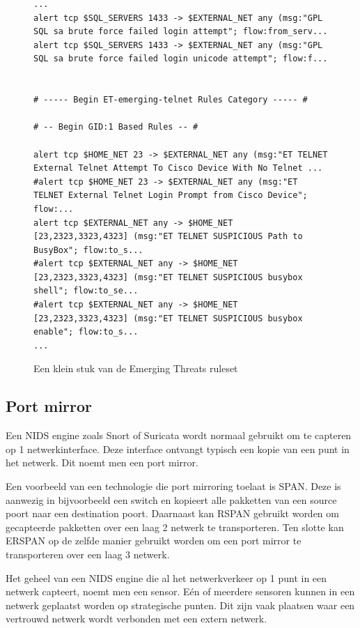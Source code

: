 \documentclass[a4paper,12pt]{report}
\begin{document}
\begin{figure}[H]
  \begin{lstlisting}[basicstyle=\ttfamily\scriptsize]
...
alert tcp $SQL_SERVERS 1433 -> $EXTERNAL_NET any (msg:"GPL SQL sa brute force failed login attempt"; flow:from_serv...
alert tcp $SQL_SERVERS 1433 -> $EXTERNAL_NET any (msg:"GPL SQL sa brute force failed login unicode attempt"; flow:f...


# ----- Begin ET-emerging-telnet Rules Category ----- #

# -- Begin GID:1 Based Rules -- #

alert tcp $HOME_NET 23 -> $EXTERNAL_NET any (msg:"ET TELNET External Telnet Attempt To Cisco Device With No Telnet ...
#alert tcp $HOME_NET 23 -> $EXTERNAL_NET any (msg:"ET TELNET External Telnet Login Prompt from Cisco Device"; flow:...
alert tcp $EXTERNAL_NET any -> $HOME_NET [23,2323,3323,4323] (msg:"ET TELNET SUSPICIOUS Path to BusyBox"; flow:to_s...
#alert tcp $EXTERNAL_NET any -> $HOME_NET [23,2323,3323,4323] (msg:"ET TELNET SUSPICIOUS busybox shell"; flow:to_se...
#alert tcp $EXTERNAL_NET any -> $HOME_NET [23,2323,3323,4323] (msg:"ET TELNET SUSPICIOUS busybox enable"; flow:to_s...
...
  \end{lstlisting}
  \caption{Een klein stuk van de Emerging Threats ruleset}
  \label{fig:et-voorbeeld}
\end{figure}

\subsection{Port mirror}
Een NIDS engine zoals Snort of Suricata wordt normaal gebruikt om te capteren op 1 netwerkinterface.
Deze interface ontvangt typisch een kopie van een punt in het netwerk.
Dit noemt men een port mirror.

Een voorbeeld van een technologie die port mirroring toelaat is SPAN.
Deze is aanwezig in bijvoorbeeld een switch en kopieert alle pakketten van een source poort naar een destination poort.
Daarnaast kan RSPAN gebruikt worden om gecapteerde pakketten over een laag 2 netwerk te transporteren.
Ten slotte kan ERSPAN op de zelfde manier gebruikt worden om een port mirror te transporteren over een laag 3 netwerk.
\autocite{cisco:span}

Het geheel van een NIDS engine die al het netwerkverkeer op 1 punt in een netwerk capteert, noemt men een sensor.
Eén of meerdere sensoren kunnen in een netwerk geplaatst worden op strategische punten.
Dit zijn vaak plaatsen waar een vertrouwd netwerk wordt verbonden met een extern netwerk.
\end{document}
